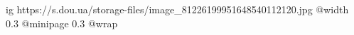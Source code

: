  
 
 
 
 

\ifcmt
  ig https://s.dou.ua/storage-files/image_81226199951648540112120.jpg
  @width 0.3
  @minipage 0.3
  @wrap \parpic[r]
\fi
